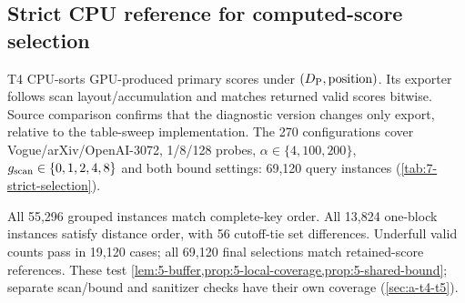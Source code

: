 \subsection{Strict CPU reference for computed-score selection}
\label{sec:7-strict-selection}

T4 CPU-sorts GPU-produced primary scores under $(D_{\mathrm{P}},\mathrm{position})$. Its exporter follows scan layout/accumulation and matches returned valid scores bitwise. Source comparison confirms that the diagnostic version changes only export, relative to the table-sweep implementation. The 270 configurations cover Vogue/arXiv/OpenAI-3072, 1/8/128 probes, $\alpha\in\{4,100,200\}$, $g_{\mathrm{scan}}\in\{0,1,2,4,8\}$ and both bound settings: 69,120 query instances (\cref{tab:7-strict-selection}).

\suppressfloats[t]
\begin{table}[htbp]
\centering
\caption[Strict computed-score selection checks]{T4 CPU-reference checks.
Set and order equality use the complete primary key. Valid count checks
$\min(c,n_c)$ survivors; final equality sorts retained computed refined
scores by $(\refineddist,\mathrm{ID})$, including their FP32 bits. Counts
are query instances, with queries reused across configurations.}
\label{tab:7-strict-selection}
\footnotesize\setlength{\tabcolsep}{3pt}

\end{table}

All 55,296 grouped instances match complete-key order. All 13,824 one-block instances satisfy distance order, with 56 cutoff-tie set differences. Underfull valid counts pass in 19,120 cases; all 69,120 final selections match retained-score references. These test \cref{lem:5-buffer,prop:5-local-coverage,prop:5-shared-bound}; separate scan/bound and sanitizer checks have their own coverage (\cref{sec:a-t4-t5}).